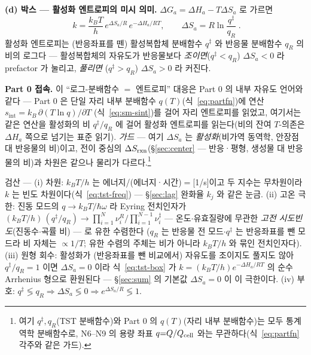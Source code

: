 \begin{bgbox}
\textbf{(d) 박스 --- 활성화 엔트로피의 미시 의미.} $\Delta G_a=\Delta H_a-T\Delta S_a$ 로 가르면
\begin{equation}
\boxed{\;k=\frac{k_BT}{h}\,e^{\Delta S_a/R}\,e^{-\Delta H_a/RT},
\qquad \Delta S_a=R\ln\frac{q^{\ddagger}}{q_R}\;.}
\label{eq:tst-box}
\end{equation}
활성화 엔트로피는 (반응좌표를 뗀) 활성복합체 분배함수 $q^{\ddagger}$ 와 반응물 분배함수 $q_R$ 의 비의 로그다 --- 활성복합체의
자유도가 반응물보다 \emph{조이면}($q^{\ddagger}<q_R$) $\Delta S_a<0$ 라 prefactor 가 눌리고, \emph{풀리면}
($q^{\ddagger}>q_R$) $\Delta S_a>0$ 라 커진다.

\textbf{Part 0 접속.} 이 ``로그-분배함수 $=$ 엔트로피'' 대응은 Part 0 의 내부 자유도 언어와 같다 --- Part 0 은
단일 자리 내부 분배함수 $q(T)$(식~\eqref{eq:partfn})에 연산 $s_\mathrm{int}=k_B\,\partial(T\ln q)/\partial T$
(식~\eqref{eq:sm-sint})를 걸어 자리 엔트로피를 읽었고, 여기서는 같은 연산을 활성화의 비 $q^{\ddagger}/q_R$ 에
걸어 활성화 엔트로피를 읽는다(비의 잔여 $T$-의존은 $\Delta H_a$ 쪽으로 넘기는 표준 읽기). \emph{가드} ---
여기 $\Delta S_a$ 는 \emph{활성화}(비가역 동역학, 안장점 대 반응물의 비)이고, 전이 중심의
$\Delta S_{\mathrm{rxn}}$(\S\ref{sec:center} --- 반응·평형, 생성물 대 반응물의 비)과 차원은 같으나 물리가
다르다.\footnote{여기 $q^{\ddagger},q_R$(TST 분배함수)와 Part 0 의 $q(T)$(자리 내부 분배함수)는 모두 통계역학
분배함수로, N6--N9 의 용량 좌표 $q{=}Q/Q_{\mathrm{cell}}$ 와는 무관하다(식~\eqref{eq:partfn} 각주와 같은 가드).}
\begin{verifybox}
검산 --- (i) 차원: $k_BT/h$ 는 에너지/(에너지·시간)$=$[1/s]이고 두 지수는 무차원이라 $k$ 는 빈도
차원이다(식~\eqref{eq:tst-freq}) --- \S\ref{sec:lag} 완화율 $k_j$ 와 같은 눈금. (ii) 고온 극한: 진동 모드의
$q\to k_BT/\hbar\omega$ 라 Eyring 전치인자가
$(k_BT/h)\,(q^{\ddagger}/q_R)\to\prod_{i=1}^{N}\nu_i^{R}\big/\prod_{i=1}^{N-1}\nu_i^{\ddagger}$
--- 온도$\cdot$유효질량에 무관한 \emph{고전 시도빈도}(진동수$\cdot$곡률 비) --- 로 유한 수렴한다
($q_R$ 는 반응물 전 모드$\cdot$$q^{\ddagger}$ 는 반응좌표를 뺀 모드라 비 자체는 $\propto1/T$;
유한 수렴의 주체는 비가 아니라 $k_BT/h$ 와 묶인 전치인자다). (iii) 원형 회수: 활성화가 (반응좌표를 뺀 비교에서) 자유도를 조이지도 풀지도 않아 $q^{\ddagger}/q_R=1$ 이면
$\Delta S_a=0$ 이라 식~\eqref{eq:tst-box} 가 $k=(k_BT/h)e^{-\Delta H_a/RT}$ 의 순수 Arrhenius 형으로 환원된다
--- \S\ref{sec:sum} 의 기본값 $\Delta S_a{=}0$ 이 이 극한이다. (iv) 부호:
$q^{\ddagger}\lessgtr q_R\Rightarrow\Delta S_a\lessgtr0\Rightarrow e^{\Delta S_a/R}\lessgtr1$.
\end{verifybox}
\end{bgbox}

